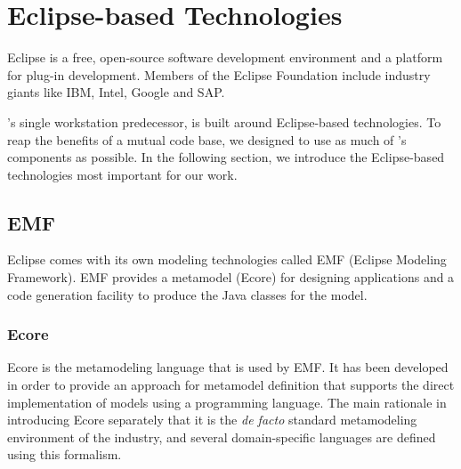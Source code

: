 
\section{Eclipse-based Technologies}

Eclipse is a free, open-source software development environment and a platform for plug-in development. Members of the Eclipse Foundation include industry giants like IBM, Intel, Google and SAP.

\iqd{}'s single workstation predecessor, \eiq{} is built around Eclipse-based technologies. To reap the benefits of a mutual code base, we designed \iqd{} to use as much of \eiq's components as possible. In the following section, we introduce the Eclipse-based technologies most important for our work.

\subsection{EMF}
\label{emf}

Eclipse comes with its own modeling technologies called EMF (Eclipse Modeling Framework). EMF provides a metamodel (Ecore) for designing applications and a code generation facility to produce the Java classes for the model.

\subsubsection{Ecore}
\label{ecore}


Ecore is the metamodeling language that is used by EMF. It has been developed in order to provide an approach
for metamodel definition that supports the direct implementation of models using a programming language. 
The main rationale in introducing Ecore separately that it is the \emph{de facto}
standard metamodeling environment of the industry, and several domain-specific
languages are defined using this formalism.

